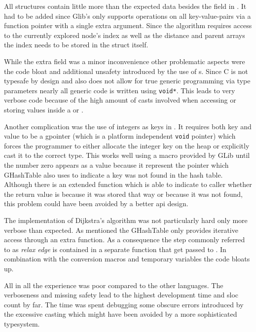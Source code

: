 All structures contain little more than the expected data besides the  field in . It had to be added since Glib's  only supports operations on all key-value-pairs via a function pointer with a single extra argument. Since the algorithm requires access to the currently explored node's index as well as the distance and parent arrays the index needs to be stored in the struct itself.

While the extra field was a minor inconvenience other problematic aspects were the code bloat and additional unsafety introduced by the use of s. Since C is not typesafe by design and also does not allow for true generic programming via type parameters nearly all generic code is written using \lstinline[style=c]{void*}. This leads to very verbose code because of the high amount of casts involved when accessing or storing values inside a  or .

Another complication was the use of integers as keys in . It requires both key and value to be a gpointer (which is a platform independent \lstinline{void} pointer) which forces the programmer to either allocate the integer key on the heap or explicitly cast it to the correct type. This works well using a macro provided by GLib until the number zero appears as a value because it represent the  pointer which GHashTable also uses to indicate a key was not found in the hash table. Although there is an extended function which is able to indicate to caller whether the return value is  because it was stored that way or because it was not found, this problem could have been avoided by a better \acrshort{api} design.

The implementation of Dijkstra's algorithm was not particularly hard only more verbose than expected. As mentioned the GHashTable only provides iterative access through an extra function. As a consequence the step commonly referred to as \textit{relax edge} is contained in a separate function that get passed to . In combination with the conversion macros and temporary variables the code bloats up.

All in all the experience was poor compared to the other languages. The verboseness and missing safety lead to the highest development time and \gls{sloc} count by far. The time was spent debugging some obscure errors introduced by the excessive casting which might have been avoided by a more sophisticated typesystem.

